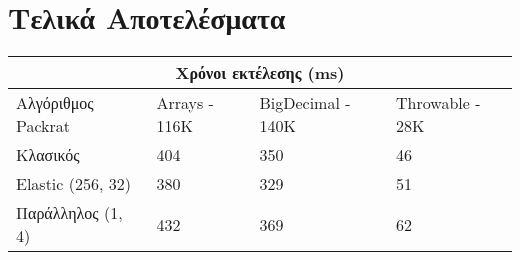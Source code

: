 \section{Τελικά Αποτελέσματα}

\begin{tabular}{ |p{4cm}||p{3cm}|p{3cm}|p{3cm}|  }
 \hline
  \multicolumn{4}{|c|}{Χρόνοι εκτέλεσης (ms)} \\
 \hline
  Αλγόριθμος Packrat& Arrays - 116K &BigDecimal - 140K &Throwable - 28K\\
 \hline
 Κλασικός & 404 & 350 & \cellcolor{green!45}46\\
  Elastic (256, 32) & \cellcolor{green!45}380 & \cellcolor{green!45}329 & 51\\
  Παράλληλος (1, 4) & 432 & 369 & 62\\
 \hline
\end{tabular}
